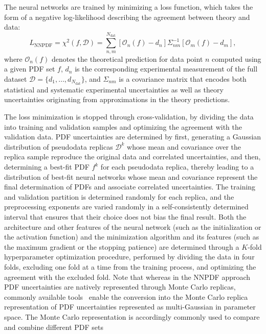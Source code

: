 \documentclass[11pt,a4paper]{article}
\begin{document}
The neural networks are trained by minimizing a loss function, which takes the form of a negative log-likelihood describing the agreement between theory and data:
%
\begin{equation}
  L_{\text{NNPDF}} = \chi^2(f,\mathcal{D})= \sum_{n,m}^{N_{\text{dat}}}
  \left[ \mathcal{O}_{n}(f) - d_{n} \right] \Sigma_{nm}^{-1}
  \left[ \mathcal{O}_{m}(f) - d_{m} \right],
  \label{eq:loss_simp_pdf}
\end{equation}
%
where $\mathcal{O}_{n}(f)$ denotes the theoretical prediction for data point $n$ computed using a given PDF set $f$, $d_{n}$ is the corresponding experimental measurement of the full dataset $\mathcal{D} = \{d_1,\dots,d_{N_{\text{dat}}}\}$, and $\Sigma_{nm}$ is a covariance matrix that encodes both statistical and systematic experimental uncertainties as well as theory uncertainties originating from approximations in the theory predictions.  

The loss minimization is stopped through cross-validation, by dividing the data into training and validation samples and optimizing the agreement with the validation data. PDF uncertainties are determined by first, generating a Gaussian distribution of pseudodata replicas $\mathcal{D}^k$ whose mean and  covariance over the replica sample reproduce the original data and correlated uncertainties, and then, determining a best-fit PDF $f^k$ for each pseudodata replica, thereby leading to a distribution of best-fit neural networks whose mean and covariance represent the final determination of PDFs and associate correlated uncertainties. The training and validation partition is determined randomly for each replica, and the preprocessing exponents are varied randomly in a self-consistently determined interval that ensures that their choice does not bias the final result. Both the architecture and other features of the neural network (such as the initialization or the activation function) and the minimization algorithm and its features (such as the maximum gradient or the stopping patience) are determined through a $K$-fold hyperparameter optimization procedure, performed by dividing the data in four folds, excluding one fold at a time from the training process, and optimizing the agreement with the excluded fold.
Note that whereas in the NNPDF approach PDF uncertainties are natively represented  through Monte Carlo replicas, commonly available tools~\cite{Watt:2012tq} enable the conversion into the Monte Carlo replica representation of PDF uncertainties represented as multi-Gaussian in parameter space. The Monte Carlo representation is accordingly commonly used to compare and combine different PDF sets~\cite{PDF4LHCWorkingGroup:2022cjn}
\end{document}
